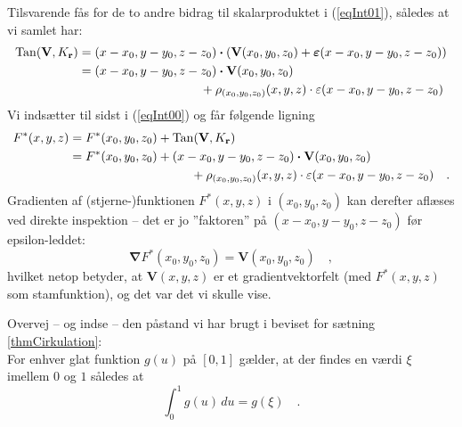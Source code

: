 \begin{bevis}
Tilsvarende fås for de to andre bidrag til skalarproduktet i (\ref{eqInt01}), således at vi samlet har:
\begin{equation}
\begin{aligned}
\Tan(\mathbf{V}, K_{\mathbf{r}}) &= (x-x_{0}, y-y_{0}, z-z_{0}) \bm{\cdot} \left(\mathbf{V}(x_{0}, y_{0}, z_{0}) + \bm{\varepsilon}(x-x_{0}, y-y_{0}, z-z_{0})\right) \\
&= (x-x_{0}, y-y_{0}, z-z_{0})\bm{\cdot} \mathbf{V}(x_{0}, y_{0}, z_{0}) \\
&\phantom{(x-x_{0}, y-y_{0}, z-z_{0})}+ \rho_{(x_{0}, y_{0}, z_{0})}(x,y,z)\cdot {\varepsilon}(x-x_{0}, y-y_{0}, z-z_{0})
\end{aligned}
\end{equation}
Vi indsætter til sidst i (\ref{eqInt00}) og får følgende ligning
\begin{equation}
\begin{aligned}
F^{*}(x,y,z) &= F^{*}(x_{0}, y_{0}, z_{0}) + \Tan(\mathbf{V}, K_{\mathbf{r}}) \\
&= F^{*}(x_{0}, y_{0}, z_{0}) + (x-x_{0}, y-y_{0}, z-z_{0})\bm{\cdot} \mathbf{V}(x_{0}, y_{0}, z_{0}) \\
&\phantom{(x-x_{0}, y-y_{0}, z-z_{0})}+ \rho_{(x_{0}, y_{0}, z_{0})}(x,y,z)\cdot {\varepsilon}(x-x_{0}, y-y_{0}, z-z_{0})\quad.
\end{aligned}
\end{equation}
Gradienten af (stjerne-)funktionen $F^{*}(x,y,z)$ i $(x_{0}, y_{0}, z_{0})$  kan derefter aflæses ved direkte inspektion -- det er jo ''faktoren'' på
$(x-x_{0}, y-y_{0}, z-z_{0})$ før epsilon-leddet:
\begin{equation}
\bm{\nabla}F^{*}(x_{0},y_{0},z_{0}) = \mathbf{V}(x_{0}, y_{0}, z_{0}) \quad,
\end{equation}
hvilket netop betyder, at $\mathbf{V}(x, y, z)$ er et gradientvektorfelt (med $F^{*}(x,y,z)$ som stamfunktion), og det var det vi skulle vise.
\end{bevis}

\begin{exercise}\label{exercIntMean}
Overvej -- og indse -- den påstand vi har brugt i beviset for sætning \ref{thmCirkulation}:\\
For enhver glat funktion $g(u)$ på $[0, 1]$ gælder, at
der findes en værdi $\xi$ imellem $0$ og $1$ således at
\begin{equation}
\int_{0}^{1} g(u) \, du = g(\xi) \quad .
\end{equation}
\end{exercise}



